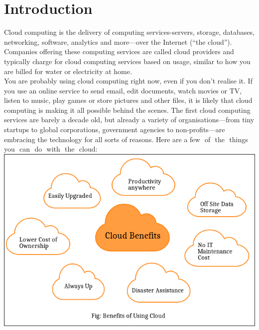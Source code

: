 \documentclass[a4paper,12pt]{report}
\begin{document}
\tableofcontents{}

\chapter{Introduction}
Cloud computing is the delivery of computing services-servers, storage, databases,
networking, software, analytics and more—over the Internet (“the cloud”). Companies
offering these computing services are called cloud providers and typically charge for cloud
computing services based on usage, similar to how you are billed for water or electricity at
home.\\
You are probably using cloud computing right now, even if you don’t realise it. If you use an
online service to send email, edit documents, watch movies or TV, listen to music, play
games or store pictures and other files, it is likely that cloud computing is making it all
possible behind the scenes. The first cloud computing services are barely a decade old, but
already a variety of organisations—from tiny startups to global corporations, government
agencies to non-profits—are embracing the technology for all sorts of reasons. Here are a
few​ ​ of​ ​ the​ ​ things​ ​ you​ ​ can​ ​ do​ ​ with​ ​ the​ ​ cloud:\\

\includegraphics[scale=.65]{benefits_of_cloud}\\
\end{document}
